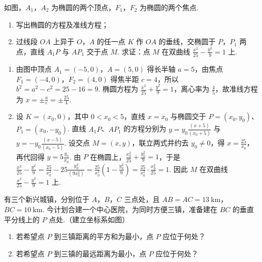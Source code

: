 \begin{problem}
如图，\(A_1\)，\(A_2\) 为椭圆的两个顶点，\(F_1\)，\(F_2\) 为椭圆的两个焦点.

\begin{enumerate}
\item 写出椭圆的方程及准线方程；
\item 过线段 \(OA\) 上异于 \(O\)，\(A\) 的任一点 \(K\) 作 \(OA\) 的垂线，交椭圆于 \(P\)，\(P_1\) 两点，直线 \(A_1P\) 与 \(AP_1\) 交于点 \(M\). 求证：点 \(M\) 在双曲线 \(\frac{x^{2}}{25} - \frac{y^{2}}{9} = 1\) 上.
\end{enumerate}

\end{problem}

\begin{solution}
\begin{enumerate}
\item 由图中顶点 \(A_1=(-5,0)\)，\(A=(5,0)\) 得长半轴 \(a=5\)，由焦点 \(F_1=(-4,0)\)，\(F_2=(4,0)\) 得焦半距 \(c=4\)，所以 \(b^2=a^2-c^2=25-16=9\). 椭圆方程为 \(\frac{x^2}{25}+\frac{y^2}{9}=1\)，离心率为 \(\frac{4}{5}\)，故准线方程为 \(x=\pm \frac{a}{e}=\pm\frac{25}{4}\).
\item 设 \(K=(x_0,0)\)，其中 \(0<x_0<5\)，直线 \(x=x_0\) 与椭圆交于 \(P=(x_0,y_0)\)、\(P_1=(x_0,-y_0)\). 直线 \(A_1P\)、\(AP_1\) 的方程分别为 \(y=y_0\frac{(x+5)}{(x_0+5)}\) 与 \(y=-y_0\frac{(x-5)}{(x_0-5)}\). 设交点 \(M=(x,y)\)，联立两式并约去 \(y_0\ne0\)，得 \(x=\frac{25}{x_0}\)，再代回得 \(y=5\frac{y_0}{x_0}\). 由 \(P\) 在椭圆上，\(\frac{x_0^2}{25}+\frac{y_0^2}{9}=1\)，于是 \(\frac{x^2}{25}-\frac{y^2}{9}=\frac{25}{x_0^2}-25\frac{y_0^2}{(9x_0^2)}=\frac{25}{x_0^2}(1-\frac{y_0^2}{9})=\frac{25}{x_0^2}\cdot \frac{x_0^2}{25}=1\). 因此 \(M\) 在双曲线 \(\frac{x^2}{25}-\frac{y^2}{9}=1\) 上.
\end{enumerate}
\end{solution}

\begin{problem}
有三个新兴城镇，分别位于 \(A\)，\(B\)，\(C\) 三点处，且 \(AB = AC = 13 \mathrm{~km}\)，\(BC = 10 \mathrm{~km}\). 今计划合建一个中心医院，为同时方便三镇，准备建在 \(BC\) 的垂直平分线上的 \(P\) 点处.（建立坐标系如图）

\begin{enumerate}
\item 若希望点 \(P\) 到三镇距离的平方和为最小，点 \(P\) 应位于何处？
\item 若希望点 \(P\) 到三镇的最远距离为最小，点 \(P\) 应位于何处？
\end{enumerate}

\end{problem}

